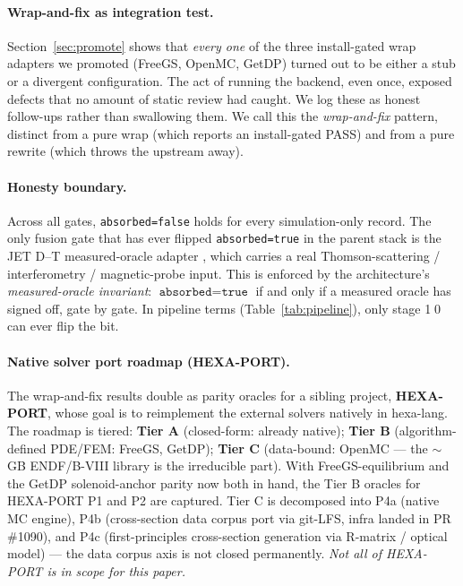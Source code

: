 \documentclass[11pt,a4paper]{article}
\begin{document}
\paragraph{Wrap-and-fix as integration test.}
Section~\ref{sec:promote} shows that \emph{every one} of the three
install-gated wrap adapters we promoted (FreeGS, OpenMC, GetDP)
turned out to be either a stub or a divergent configuration. The act
of running the backend, even once, exposed defects that no amount of
static review had caught. We log these as honest follow-ups rather
than swallowing them. We call this the \emph{wrap-and-fix} pattern,
distinct from a pure wrap (which reports an install-gated PASS) and
from a pure rewrite (which throws the upstream away).

\paragraph{Honesty boundary.} Across all gates,
\texttt{absorbed=false} holds for every simulation-only record. The
only fusion gate that has ever flipped \texttt{absorbed=true} in the
parent stack is the JET D--T measured-oracle adapter
\citep{keilhacker1999jet}, which carries a real Thomson-scattering /
interferometry / magnetic-probe input. This is enforced by the
architecture's \emph{measured-oracle invariant}:
$\texttt{absorbed}=\texttt{true}$ if and only if a measured oracle
has signed off, gate by gate. In pipeline terms
(Table~\ref{tab:pipeline}), only stage \textcircled{\scriptsize 10}
can ever flip the bit.

\paragraph{Native solver port roadmap (HEXA-PORT).} The wrap-and-fix
results double as parity oracles for a sibling project,
\textbf{HEXA-PORT}, whose goal is to reimplement the external solvers
natively in hexa-lang. The roadmap is tiered: \textbf{Tier A}
(closed-form: already native); \textbf{Tier B} (algorithm-defined
PDE/FEM: FreeGS, GetDP); \textbf{Tier C} (data-bound: OpenMC --- the
$\sim$GB ENDF/B-VIII library is the irreducible part). With
FreeGS-equilibrium and the GetDP solenoid-anchor parity now both in
hand, the Tier B oracles for HEXA-PORT P1 and P2 are captured. Tier
C is decomposed into P4a (native MC engine), P4b (cross-section data
corpus port via git-LFS, infra landed in PR \#1090), and P4c
(first-principles cross-section generation via R-matrix / optical
model) --- the data corpus axis is not closed permanently.
\emph{Not all of HEXA-PORT is in scope for this paper.}
\end{document}
